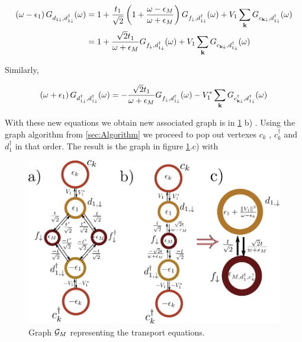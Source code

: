  \begin{align}
\left(\omega-\epsilon_{1}\right)G_{d_{1\downarrow},d_{1\downarrow}^{\dagger}}(\omega)&=1+\frac{t_{1}}{\sqrt{2}}\left(1+\frac{\omega-\epsilon_{M}}{\omega+\epsilon_{M}}\right)G_{f_{\downarrow},d_{1\downarrow}^{\dagger}}(\omega)+V_{1}\sum_{\mathbf{k}}G_{c_{\mathbf{k\downarrow}},d_{1\downarrow}^{\dagger}}(\omega) \\
&=1+\frac{\sqrt{2}t_{1}}{\omega+\epsilon_{M}}G_{f_{\downarrow},d_{1\downarrow}^{\dagger}}(\omega)+V_{1}\sum_{\mathbf{k}}G_{c_{\mathbf{k\downarrow}},d_{1\downarrow}^{\dagger}}(\omega)
\end{align}

Similarly, 

\begin{equation}
    \left(\omega+\epsilon_{1}\right)G_{d_{1\downarrow}^{\dagger},d_{1\downarrow}^{\dagger}}(\omega)=-\frac{\sqrt{2}t_{1}}{\omega+\epsilon_{M}}G_{f_{\downarrow},d_{1\downarrow}^{\dagger}}(\omega)-V_{1}^{*}\sum_{\mathbf{k}}G_{c_{\mathbf{k\downarrow}}^{\dagger},d_{1\downarrow}^{\dagger}}(\omega)
\end{equation} 
 
 
 With these new equations we obtain new associated graph is  in \ref{fig:green-M-QD} b) .  Using the graph algorithm from \ref{sec:Algorithm}  we proceed to pop out vertexes $c_k$ , $c_k^\dagger$ and $d_1^\dagger$ in that order. The result is the graph in figure \ref{fig:green-M-QD}.c) with 
 
 \begin{figure}[t]
    \centering
    \includegraphics[scale=0.5]{IMAGES/Graphs/Grenn-Majorana.png}
    \caption{ Graph $\mathcal{G}_M$ representing the transport equations.  \label{fig:green-M-QD} \protect{}}
\end{figure}
 
